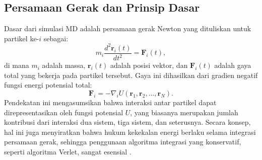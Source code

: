 \subsection{Persamaan Gerak dan Prinsip Dasar}
Dasar dari simulasi MD adalah persamaan gerak Newton yang dituliskan untuk partikel ke-\(i\) sebagai:
\begin{equation}
    m_i \frac{d^2 \mathbf{r}_i(t)}{dt^2} = \mathbf{F}_i(t),
\end{equation}
di mana \(m_i\) adalah massa, \(\mathbf{r}_i(t)\) adalah posisi vektor, dan \(\mathbf{F}_i(t)\) adalah gaya total yang bekerja pada partikel tersebut.
Gaya ini dihasilkan dari gradien negatif fungsi energi potensial total:
\begin{equation}
    \mathbf{F}_i = -\nabla_i U(\mathbf{r}_1, \mathbf{r}_2, \ldots, \mathbf{r}_N).
\end{equation}
Pendekatan ini mengasumsikan bahwa interaksi antar partikel dapat direpresentasikan oleh fungsi potensial \( U \), yang biasanya merupakan jumlah kontribusi dari interaksi dua sistem, tiga sistem, dan seterusnya.
Secara konsep, hal ini juga menyiratkan bahwa hukum kekekalan energi berlaku selama integrasi persamaan gerak, sehingga penggunaan algoritma integrasi yang konservatif, seperti algoritma Verlet, sangat esensial \cite{Allen1989}.

